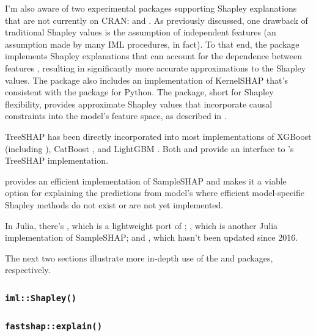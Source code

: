 I'm also aware of two experimental packages supporting Shapley
explanations that are not currently on CRAN: 
\citep{R-sellereite} and  \citep{R-shapFlex}. As
previously discussed, one drawback of traditional Shapley values is the
assumption of independent features (an assumption made by many IML
procedures, in fact). To that end, the  package implements
Shapley explanations that can account for the dependence between
features \citep{aas-2019-explaining}, resulting in significantly more
accurate approximations to the Shapley values. The package also includes
an implementation of KernelSHAP that's consistent with the 
package for Python. The  package, short for Shapley
flexibility, provides approximate Shapley values that incorporate causal
constraints into the model's feature space, as described in
\citet{frye-2019-asymmetric}.

TreeSHAP has been directly incorporated into most implementations of
XGBoost \citep{chen-2016-xgboost} (including 
\citep{R-xgboost}), CatBoost \citep{eronika-2017-catboost}, and LightGBM
\citep{ke-2017-lightgbm}. Both  \citep{R-fastshap} and
 \citep{R-SHAPforxgboost} provide an interface
to 's TreeSHAP implementation.

 provides an efficient implementation of SampleSHAP
and makes it a viable option for explaining the predictions from model's
where efficient model-specific Shapley methods do not exist or are not
yet implemented.

In Julia, there's , which is a lightweight port of
; , which is another Julia implementation
of SampleSHAP; and , which hasn't been updated
since 2016.

The next two sections illustrate more in-depth use of the  and
 packages, respectively.

\hypertarget{imlshapley}{%
\subsubsection{\texorpdfstring{\texttt{iml::Shapley()}}{iml::Shapley()}}\label{imlshapley}}

\hypertarget{fastshapexplain}{%
\subsubsection{\texorpdfstring{\texttt{fastshap::explain()}}{fastshap::explain()}}\label{fastshapexplain}}

